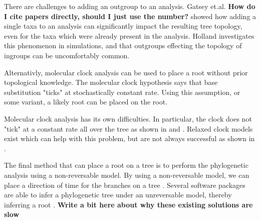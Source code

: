 \documentclass{article}
\newcommand{\BenComment}[1]{{\bf \color{blue} {#1}}}
\begin{document}
There are challenges to adding an outgroup to an analysis. Gatsey et.al.
\cite{gatesy_how_2007} \BenComment{How do I cite papers directly, should I just
  use the number?} showed how adding a single taxa to an analysis can
significantly impact the resulting tree topology, even for the taxa which were
already present in the analysis. Holland \cite{holland_outgroup_2003}
investigates this phenomenon in simulations, and that outgroups effecting the
topology of ingroups can be uncomfortably common.

Alternativly, molecular clock analysis can be used to place a root without prior
topological knowledge\cite{yang_computational_2006}. The molecular clock
hypothesis says that base substitution "ticks" at stochastically constant rate.
Using this assumption, or some variant, a likely root can be placed on the root.

Molecular clock analysis has its own difficulties. In particular, the clock
does not "tick" at a constant rate all over the tree as shown in
\cite{steiper_primate_2006} and \cite{li_molecular_1987}. Relaxed clock models
exist which can help with this problem, but are not always successful as shown
in \cite{battistuzzi_performance_2010}.

The final method that can place a root on a tree is to perform the phylogenetic
analysis using a non-reversable model. By using a non-reversable model, we can
place a direction of time for the branches on a tree
\cite{yap_rooting_2005}. Several software packages are able to infer a
phylogenetic tree under an unreversable model, thereby inferring a root
\cite{nguyen_iq-tree:_2015} \cite{ronquist_mrbayes_2003}. \BenComment{Write a
  bit here about why these existing solutions are slow}

%
%
\end{document}
